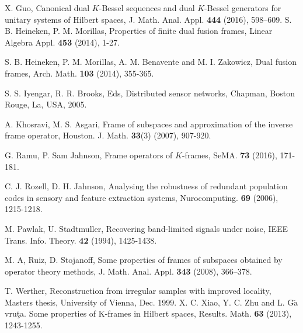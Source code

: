 \documentclass{birkjour}
\theoremstyle{definition}
\theoremstyle{remark}
\numberwithin{equation}{section}
\begin{document}
\begin{thebibliography}{10}
 X. Guo, Canonical dual $K$-Bessel sequences and dual $K$-Bessel generators for unitary systems of Hilbert spaces, J. Math. Anal.
Appl. {\bf 444} (2016), 598--609.
 S. B. Heineken, P. M. Morillas, Properties of finite dual fusion frames,
Linear Algebra Appl. \textbf{453} (2014), 1-27.



S. B. Heineken, P. M. Morillas, A. M. Benavente and M. I. Zakowicz,
Dual fusion frames, Arch. Math. \textbf{103} (2014), 355-365.



S. S. Iyengar, R. R. Brooks, Eds,
Distributed sensor networks, Chapman, Boston Rouge, La, USA, 2005.

 A. Khosravi, M. S. Asgari, Frame of subspaces and approximation of the inverse frame operator, Houston. J. Math. \textbf{33}(3) (2007), 907-920.


G. Ramu, P. Sam Jahnson, Frame operators of $K$-frames, SeMA. \textbf{73} (2016), 171-181.

C. J. Rozell, D. H. Jahnson, Analysing the robustness of redundant population codes in sensory and feature extraction systems, Nurocomputing. \textbf{69} (2006), 1215-1218.


 M. Pawlak, U. Stadtmuller, Recovering band-limited signals under noise, IEEE Trans. Info. Theory. \textbf{42} (1994), 1425-1438.







 M. A,  Ruiz, D. Stojanoff,  Some properties of frames of subspaces obtained by operator theory methods, J. Math. Anal. Appl. {\bf 343} (2008), 366--378.


 T. Werther, Reconstruction from irregular samples with improved locality, Masters thesis, University of Vienna, Dec. 1999.
 X. C. Xiao, Y. C. Zhu and L. G$\breve{\textrm{a}}$vru\c{t}a. Some properties of K-frames in Hilbert spaces, Results. Math.  \textbf{63} (2013), 1243-1255.



\end{thebibliography}

\end{document}
